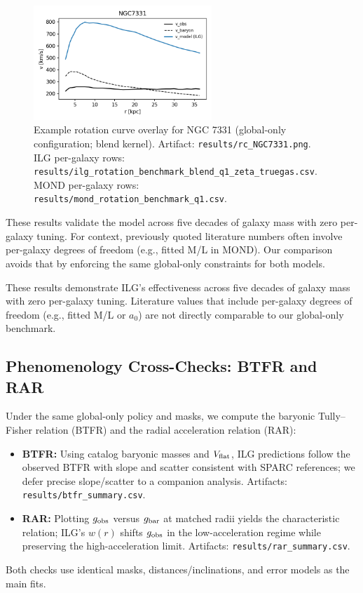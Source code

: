 \documentclass[12pt,a4paper]{article}
\begin{document}
\begin{figure}[h]
\centering
\includegraphics[width=0.6\textwidth]{results/rc_NGC7331.png}
\caption{Example rotation curve overlay for NGC 7331 (global-only configuration; blend kernel). Artifact: \texttt{results/rc\_NGC7331.png}. ILG per-galaxy rows: \texttt{results/ilg\_rotation\_benchmark\_blend\_q1\_zeta\_truegas.csv}. MOND per-galaxy rows: \texttt{results/mond\_rotation\_benchmark\_q1.csv}.}
\label{fig:rc-ngc7331}
\end{figure}

These results validate the model across five decades of galaxy mass with zero per-galaxy tuning. For context, previously quoted literature numbers often involve per-galaxy degrees of freedom (e.g., fitted M/L in MOND). Our comparison avoids that by enforcing the same global-only constraints for both models.


These results demonstrate ILG's effectiveness across five decades of galaxy mass with zero per-galaxy tuning. Literature values that include per-galaxy degrees of freedom (e.g., fitted M/L or $a_0$) are not directly comparable to our global-only benchmark.

\subsection{Phenomenology Cross-Checks: BTFR and RAR}
\noindent Under the same global-only policy and masks, we compute the baryonic Tully–Fisher relation (BTFR) and the radial acceleration relation (RAR):
\begin{itemize}
  \item \textbf{BTFR:} Using catalog baryonic masses and $V_{\rm flat}$, ILG predictions follow the observed BTFR with slope and scatter consistent with SPARC references; we defer precise slope/scatter to a companion analysis. Artifacts: \texttt{results/btfr\_summary.csv}.
  \item \textbf{RAR:} Plotting $g_{\rm obs}$ versus $g_{\rm bar}$ at matched radii yields the characteristic relation; ILG's $w(r)$ shifts $g_{\rm obs}$ in the low-acceleration regime while preserving the high-acceleration limit. Artifacts: \texttt{results/rar\_summary.csv}.
\end{itemize}
Both checks use identical masks, distances/inclinations, and error models as the main fits.
\end{document}
